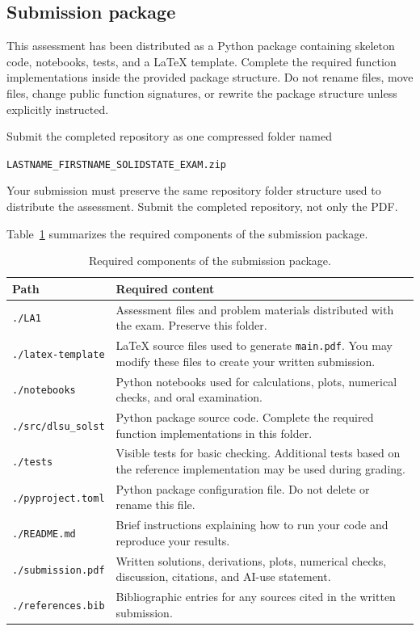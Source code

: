 \subsection{Submission package}

This assessment has been distributed as a Python package containing skeleton code, notebooks, tests, and a \LaTeX{} template. Complete the required function implementations inside the provided package structure. Do not rename files, move files, change public function signatures, or rewrite the package structure unless explicitly instructed.

Submit the completed repository as one compressed folder named

\begin{center}
\texttt{LASTNAME\_FIRSTNAME\_SOLIDSTATE\_EXAM.zip}
\end{center}

Your submission must preserve the same repository folder structure used to distribute the assessment. Submit the completed repository, not only the PDF.

Table~\ref{tab:submission-components} summarizes the required components of the submission package.

\begin{table}[h]
\centering
\caption{Required components of the submission package.}
\label{tab:submission-components}
\begin{tabularx}{\textwidth}{lX}
\toprule
Path & Required content \\
\midrule
\texttt{./LA1} & Assessment files and problem materials distributed with the exam. Preserve this folder. \\
\texttt{./latex-template} & \LaTeX{} source files used to generate \texttt{main.pdf}. You may modify these files to create your written submission. \\
\texttt{./notebooks} & Python notebooks used for calculations, plots, numerical checks, and oral examination. \\
\texttt{./src/dlsu\_solst} & Python package source code. Complete the required function implementations in this folder. \\
\texttt{./tests} & Visible tests for basic checking. Additional tests based on the reference implementation may be used during grading. \\
\texttt{./pyproject.toml} & Python package configuration file. Do not delete or rename this file. \\
\texttt{./README.md} & Brief instructions explaining how to run your code and reproduce your results. \\
\texttt{./submission.pdf} & Written solutions, derivations, plots, numerical checks, discussion, citations, and AI-use statement. \\
\texttt{./references.bib} & Bibliographic entries for any sources cited in the written submission. \\
\bottomrule
\end{tabularx}
\end{table}

